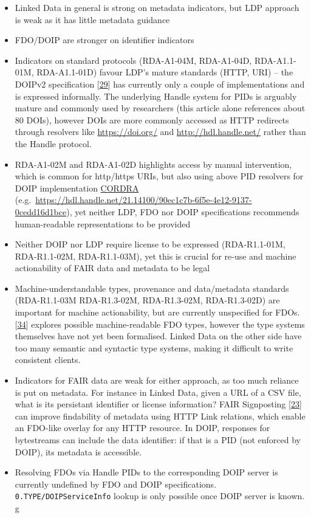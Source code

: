 \begin{itemize}
\tightlist
\item
  Linked Data in general is strong on metadata indicators, but LDP approach is weak as it has little metadata guidance
\item
  FDO/DOIP are stronger on identifier indicators
\item
  Indicators on standard protocols (RDA-A1-04M, RDA-A1-04D, RDA-A1.1-01M, RDA-A1.1-01D) favour LDP's mature standards (HTTP, URI) -- the DOIPv2 specification {[}\protect\hyperlink{ref-13TcbsZF6}{29}{]} has currently only a couple of implementations and is expressed informally. The underlying Handle system for PIDs is arguably mature and commonly used by researchers (this article alone references about 80 DOIs), however DOIs are more commonly accessed as HTTP redirects through resolvers like \url{https://doi.org/} and \url{http://hdl.handle.net/} rather than the Handle protocol.
\item
  RDA-A1-02M and RDA-A1-02D highlights access by manual intervention, which is common for http/https URIs, but also using above PID resolvers for DOIP implementation \href{https://www.cordra.org/}{CORDRA} (e.g.~\url{https://hdl.handle.net/21.14100/90ec1c7b-6f5e-4e12-9137-0cedd16d1bce}), yet neither LDP, FDO nor DOIP specifications recommends human-readable representations to be provided
\item
  Neither DOIP nor LDP require license to be expressed (RDA-R1.1-01M, RDA-R1.1-02M, RDA-R1.1-03M), yet this is crucial for re-use and machine actionability of FAIR data and metadata to be legal
\item
  Machine-understandable types, provenance and data/metadata standards (RDA-R1.1-03M RDA-R1.3-02M, RDA-R1.3-02M, RDA-R1.3-02D) are important for machine actionability, but are currently unspecified for FDOs. {[}\protect\hyperlink{ref-126uxr5pI}{34}{]} explores possible machine-readable FDO types, however the type systems themselves have not yet been formalised. Linked Data on the other side have too many semantic and syntactic type systems, making it difficult to write consistent clients.
\item
  Indicators for FAIR data are weak for either approach, as too much reliance is put on metadata. For instance in Linked Data, given a URL of a CSV file, what is its persistant identifier or license information? FAIR Signposting {[}\protect\hyperlink{ref-snykkm7R}{23}{]} can improve findability of metadata using HTTP Link relations, which enable an FDO-like overlay for any HTTP resource. In DOIP, responses for bytestreams can include the data identifier: if that is a PID (not enforced by DOIP), its metadata is accessible.
\item
  Resolving FDOs via Handle PIDs to the corresponding DOIP server is currently undefined by FDO and DOIP specifications. \texttt{0.TYPE/DOIPServiceInfo} lookup is only possible once DOIP server is known. g
\end{itemize}

